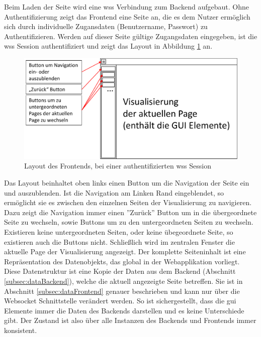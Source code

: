 Beim Laden der Seite wird eine \ac{wss} Verbindung zum Backend aufgebaut.
Ohne Authentifizierung zeigt das Frontend eine Seite an, 
die es dem Nutzer ermöglich sich durch individuelle Zugansdaten (Benutzername, Passwort) zu Authentifizieren.%
Werden auf dieser Seite gültige Zugangsdaten eingegeben, ist die \ac{wss} Session authentifiziert und 
zeigt das Layout in Abbildung \ref{fig:pageLayoutFrontendAuthenticated} an.
\begin{figure}[ht]
  \centering
  \includegraphics[width=\textwidth]{content/hauptteil/systemEntwurf/res/LayoutFrontend.pdf}
  \caption[Frontend Layout]{Layout des Frontends, bei einer authentifizierten \acs{wss} Session}
  \label{fig:pageLayoutFrontendAuthenticated}
\end{figure}
Das Layout beinhaltet oben links einen Button um die Navigation der Seite ein und auszublenden.
Ist die Navigation am Linken Rand eingeblendet, so ermöglicht sie es zwischen den einzelnen Seiten der Visualisierung zu navigieren.
Dazu zeigt die Navigation immer einen ''Zurück'' Button um in die übergeordnete Seite zu wechseln, sowie Buttons um zu den untergeordneten Seiten zu wechseln.
Existieren keine untergeordneten Seiten, oder keine übegeordnete Seite, so existieren auch die Buttons nicht.
Schließlich wird im zentralen Fenster die aktuelle Page der Visualisierung angezeigt.
Der komplette Seiteninhalt ist eine Repräsentation des Datenobjekts, das global in der Webapplikation vorliegt.
Diese Datenstruktur ist eine Kopie der Daten aus dem Backend (Abschnitt \ref{subsec:dataBackend}), welche die aktuell angezeigte Seite betreffen.
Sie ist in Abschnitt \ref{subsec:dataFrontend} genauer beschrieben und kann nur über die Websocket Schnittstelle verändert werden. 
So ist sichergestellt, dass die \ac{gui} Elemente immer die Daten des Backends darstellen und es keine Unterschiede gibt.
Der Zustand ist also über alle Instanzen des Backends und Frontends immer konsistent.
